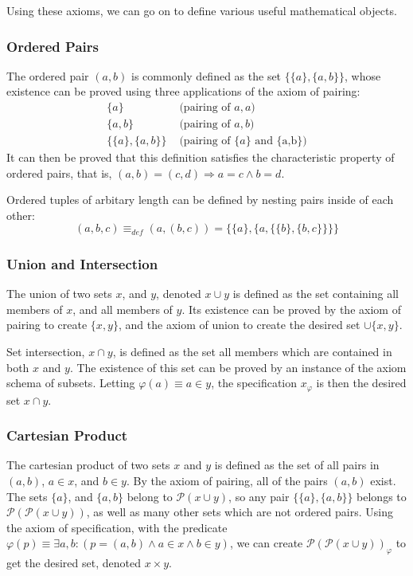 \documentclass[11pt]{report}
\theoremstyle{definition}
\theoremstyle{theorem}
\theoremstyle{lemma}
\begin{document}
Using these axioms, we can go on to define various useful mathematical objects.

\subsubsection*{Ordered Pairs}
The ordered pair $(a,b)$ is commonly defined as the set $\{\{a\},\{a,b\}\}$, whose existence can be proved using three applications of the axiom of pairing:
\begin{align*}
  \{a\} & \text{  (pairing of $a,a$)} \\
  \{a,b\} & \text{  (pairing of $a,b$)} \\
  \{\{a\}, \{a,b\}\} & \text{  (pairing of $\{a\}$ and \{a,b\})}
\end{align*}
It can then be proved that this definition satisfies the characteristic property of ordered pairs, that is, $(a,b) = (c,d) \Rightarrow a=c \wedge b=d$.

Ordered tuples of arbitary length can be defined by nesting pairs inside of each other:
$$(a,b,c) \equiv_{\mathit{def}} (a,(b,c)) = \{\{a\},\{a, \{\{b\},\{b,c\}\}\}\}$$

\subsubsection*{Union and Intersection}
The union of two sets $x$, and $y$, denoted $x\cup y$ is defined as the set containing all members of $x$, and all members of $y$. Its existence can be proved by the axiom of pairing to create $\{x,y\}$, and the axiom of union to create the desired set $\cup \{x,y\}$.

Set intersection, $x \cap y$, is defined as the set all members which are contained in both $x$ and $y$.
The existence of this set can be proved by an instance of the axiom schema of subsets. Letting $\varphi(a) \equiv a \in y$, the specification $x_\varphi$ is then the desired set $x \cap y$.

\subsubsection*{Cartesian Product}
The cartesian product of two sets $x$ and $y$ is defined as the set of all pairs in $(a,b)$, $a\in x$, and $b\in y$.
By the axiom of pairing, all of the pairs $(a,b)$ exist.
The sets $\{a\}$, and $\{a,b\}$ belong to $\mathcal{P}(x\cup y)$, so any pair $\{\{a\},\{a,b\}\}$ belongs to $\mathcal{P}(\mathcal{P}(x\cup y))$, as well as many other sets which are not ordered pairs.
Using the axiom of specification, with the predicate
$\varphi(p) \equiv \exists a,b: (p = (a,b) \wedge a\in x \wedge b\in y)$, we can create $\mathcal{P}(\mathcal{P}(x\cup y))_{\varphi}$ to get the desired set, denoted $x\times y$.
\end{document}
